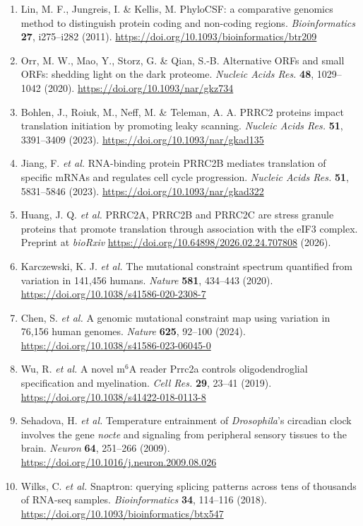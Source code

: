 \documentclass[10pt,letterpaper]{article}
\newcommand{\spname}[1]{\textit{#1}}
\newcommand{\gene}[1]{\textit{#1}}
\begin{document}
{\begin{enumerate}[leftmargin=1.9em,itemsep=-0.4pt,parsep=0pt,topsep=0.5pt]
  \item Lin, M. F., Jungreis, I. \& Kellis, M. PhyloCSF: a comparative genomics method to distinguish protein coding and non-coding regions. \textit{Bioinformatics} \textbf{27}, i275--i282 (2011). \url{https://doi.org/10.1093/bioinformatics/btr209}
  \item Orr, M. W., Mao, Y., Storz, G. \& Qian, S.-B. Alternative ORFs and small ORFs: shedding light on the dark proteome. \textit{Nucleic Acids Res.} \textbf{48}, 1029--1042 (2020). \url{https://doi.org/10.1093/nar/gkz734}
  \item Bohlen, J., Roiuk, M., Neff, M. \& Teleman, A. A. PRRC2 proteins impact translation initiation by promoting leaky scanning. \textit{Nucleic Acids Res.} \textbf{51}, 3391--3409 (2023). \url{https://doi.org/10.1093/nar/gkad135}
  \item Jiang, F. \textit{et al.} RNA-binding protein PRRC2B mediates translation of specific mRNAs and regulates cell cycle progression. \textit{Nucleic Acids Res.} \textbf{51}, 5831--5846 (2023). \url{https://doi.org/10.1093/nar/gkad322}
  \item Huang, J. Q. \textit{et al.} PRRC2A, PRRC2B and PRRC2C are stress granule proteins that promote translation through association with the eIF3 complex. Preprint at \textit{bioRxiv} \url{https://doi.org/10.64898/2026.02.24.707808} (2026).
  \item Karczewski, K. J. \textit{et al.} The mutational constraint spectrum quantified from variation in 141,456 humans. \textit{Nature} \textbf{581}, 434--443 (2020). \url{https://doi.org/10.1038/s41586-020-2308-7}
  \item Chen, S. \textit{et al.} A genomic mutational constraint map using variation in 76,156 human genomes. \textit{Nature} \textbf{625}, 92--100 (2024). \url{https://doi.org/10.1038/s41586-023-06045-0}
  \item Wu, R. \textit{et al.} A novel m$^6$A reader Prrc2a controls oligodendroglial specification and myelination. \textit{Cell Res.} \textbf{29}, 23--41 (2019). \url{https://doi.org/10.1038/s41422-018-0113-8}
  \item Sehadova, H. \textit{et al.} Temperature entrainment of \spname{Drosophila}'s circadian clock involves the gene \gene{nocte} and signaling from peripheral sensory tissues to the brain. \textit{Neuron} \textbf{64}, 251--266 (2009). \url{https://doi.org/10.1016/j.neuron.2009.08.026}
  \item Wilks, C. \textit{et al.} Snaptron: querying splicing patterns across tens of thousands of RNA-seq samples. \textit{Bioinformatics} \textbf{34}, 114--116 (2018). \url{https://doi.org/10.1093/bioinformatics/btx547}

\end{enumerate}}
\end{document}
